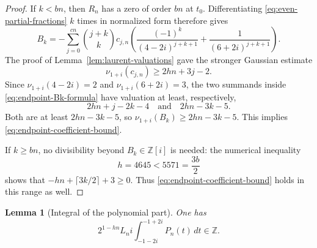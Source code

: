 \documentclass[11pt,reqno,letterpaper]{amsart}
\numberwithin{equation}{section}
\newtheorem{lemma}[theorem]{Lemma}
\theoremstyle{definition}
\theoremstyle{remark}
\begin{document}
\begin{proof}
If $k<bn$, then $R_n$ has a zero of order $bn$ at $t_0$.  Differentiating
\eqref{eq:even-partial-fractions} $k$ times in normalized form therefore
gives
\begin{equation}\label{eq:endpoint-Bk-formula}
 B_k=-\sum_{j=0}^{cn}\binom{j+k}{k}c_{j,n}
 \left(\frac{(-1)^k}{(4-2i)^{j+k+1}}
       +\frac1{(6+2i)^{j+k+1}}\right).
\end{equation}
The proof of Lemma~\ref{lem:laurent-valuations} gave the stronger
Gaussian estimate
\[
 \nu_{1+i}(c_{j,n})\geq2hn+3j-2.
\]
Since $\nu_{1+i}(4-2i)=2$ and
$\nu_{1+i}(6+2i)=3$, the two summands inside
\eqref{eq:endpoint-Bk-formula} have valuation at least, respectively,
\[
 2hn+j-2k-4
 \quad\text{and}\quad
 2hn-3k-5.
\]
Both are at least $2hn-3k-5$, so
$\nu_{1+i}(B_k)\geq2hn-3k-5$.  This implies
\eqref{eq:endpoint-coefficient-bound}.

If $k\geq bn$, no divisibility beyond $B_k\in\mathbb Z[i]$ is needed:
the numerical inequality
\[
 h=4645<5571=\frac{3b}{2}
\]
shows that $-hn+\lceil3k/2\rceil+3\geq0$.  Thus
\eqref{eq:endpoint-coefficient-bound} holds in this range as well.
\end{proof}

\begin{lemma}[Integral of the polynomial part]\label{lem:polynomial-integral}
One has
\begin{equation}\label{eq:polynomial-integrality}
 2^{1-hn}L_n i\int_{-1-2i}^{-1+2i}P_n(t)\,dt\in\mathbb Z.
\end{equation}
\end{lemma}
\end{document}
